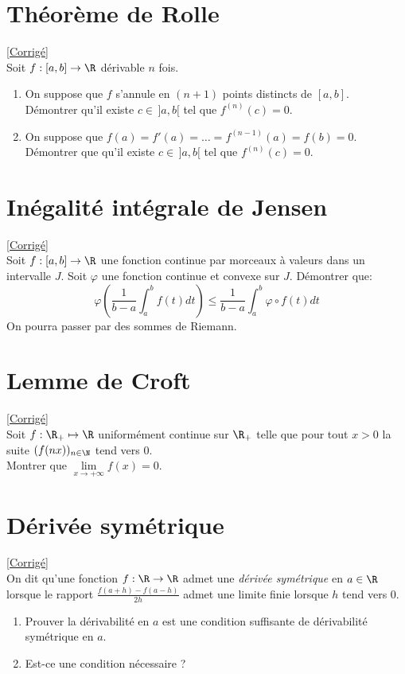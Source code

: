 \documentclass{book}
\begin{document}
	\section{Théorème de Rolle}
	\label{Théorème de Rolle}
	\textcolor{blue}{\hyperref[sec:theoreme-de-rolle]{[Corrigé]}}\\
	Soit $f:[a,b]\to\R$ dérivable $n$ fois.
	\begin{enumerate}
		\item On suppose que $f$ s'annule en $(n+1)$ points distincts de $[a,b]$.\\
		Démontrer qu'il existe $c\in\, ]a,b[$ tel que $f^{(n)}(c)=0$.
		\item On suppose que $f(a)=f'(a)=\dots=f^{(n-1)}(a)=f(b)=0$.\\
		Démontrer que qu'il existe $c\in\, ]a,b[$ tel que $f^{(n)}(c)=0$.
	\end{enumerate}
	
	\section{Inégalité intégrale de Jensen }
	\textcolor{blue}{\hyperref[Inégalité intégrale de Jensen corrigé]{[Corrigé]}}\\
	\label{Inégalité intégrale de Jensen}
	Soit $f:[a,b]\to\R$ une fonction continue par morceaux à valeurs dans un intervalle $J$. Soit $\varphi$ une fonction continue et convexe sur $J$. Démontrer que: $$\varphi\left(\frac{1}{b-a}\int_a^bf(t)dt\right)\leq\frac{1}{b-a}\int_a^b\varphi\circ f(t)dt$$
	On pourra passer par des sommes de Riemann.
	
	\section{Lemme de Croft }
	\textcolor{blue}{\hyperref[Lemme de Croft corrigé]{[Corrigé]}}\\
	\label{Lemme de Croft}
	Soit $f:\R_+\mapsto \R$ uniformément continue sur $\R_+$ telle que pour tout $x>0$ la suite $(f(nx))_{n\in\N}$ tend vers $0$.\\
	Montrer que $\lim\limits_{x\to +\infty} f(x)=0$.
	
	\section{Dérivée symétrique }
	\textcolor{blue}{\hyperref[sec:derivee-symetrique-etoile1]{[Corrigé]}}\\
	\label{deriveesymetrique}
	\label{Dérivée symétrique}
	On dit qu'une fonction $f:\R\to\R$ admet une \textit{dérivée symétrique} en $a\in\R$ lorsque le rapport $\displaystyle\frac{f(a+h)-f(a-h)}{2h}$ admet une limite finie lorsque $h$ tend vers $0$.
	\begin{enumerate}
		\item Prouver la dérivabilité en $a$ est une condition suffisante de dérivabilité symétrique en $a$.
		\item Est-ce une condition nécessaire ?
	\end{enumerate}
	
\end{document}
